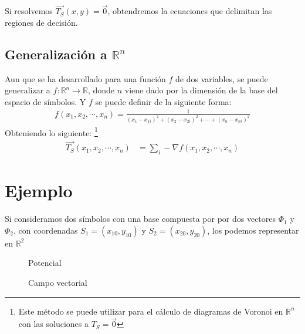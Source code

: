 \documentclass{article}
\begin{document}
Si resolvemos $\vec{T_S}(x,y) = \vec{0}$, obtendremos la ecuaciones que delimitan
las regiones de decisión.

\subsection{Generalización a $\mathbb{R}^n$}
Aun que se ha desarrollado para una función $f$ de dos variables, se puede
generalizar a $f: \mathbb{R}^n \rightarrow \mathbb{R}$, donde $n$ viene dado por la dimensión de la base
del espacio de símbolos. Y $f$ se puede definir de la siguiente forma:
\begin{align}
  \label{eq:generalf}
  f(x_1, x_2, \cdots ,x_n) = \frac{1}{(x_1 - x_{1i})^2 + (x_2 - x_{2i})^2 + \cdots + (x_n - x_{ni})^2}
\end{align}
Obteniendo lo siguiente: \footnote{Este método se puede utilizar para el cálculo
de diagramas de Voronoi en $\mathbb{R}^n$ con las soluciones a $T_S = \vec{0}$}
\begin{align}
  \label{eq:generalF}
  \vec{T_S}(x_1, x_2, \cdots , x_n) &= \sum_i -\nabla f(x_1, x_2, \cdots ,x_n)
\end{align}

\section{Ejemplo}
Si consideramos dos símbolos con una base compuesta por por dos vectores
$\Phi_1$ y $\Phi_2$, con coordenadas $S_1=(x_{10}, y_{10})$ y $S_2=(x_{20}, y_{20})$, los podemos
representar en $\mathbb{R}^2$
\begin{figure}[h!]
  \centering
  
  \caption{Potencial}
  \label{fig:pot}
\end{figure}
\begin{figure}[h!]
  \centering
  
  \caption{Campo vectorial}
  \label{fig:vecfield}
\end{figure}
\end{document}
